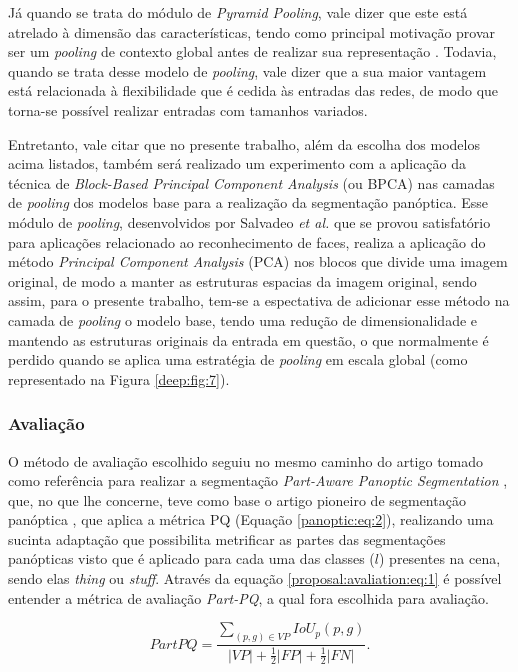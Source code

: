 Já quando se trata do módulo de \textit{Pyramid Pooling}, vale dizer que este está atrelado à dimensão das características, tendo como principal motivação provar ser um \textit{pooling} de contexto global antes de realizar sua representação \cite{Zhao2017}. Todavia, quando se trata desse modelo de \textit{pooling}, vale dizer que a sua maior vantagem está relacionada à flexibilidade que é cedida às entradas das redes, de modo que torna-se possível realizar entradas com tamanhos variados.

Entretanto, vale citar que no presente trabalho, além da escolha dos modelos acima listados, também será realizado um experimento com a aplicação da técnica de \textit{Block-Based Principal Component Analysis} (ou BPCA) nas camadas de \textit{pooling} dos modelos base para a realização da segmentação panóptica. Esse módulo de \textit{pooling}, desenvolvidos por Salvadeo \textit{et al.} \cite{Salvadeo2011} que se provou satisfatório para aplicações relacionado ao reconhecimento de faces, realiza a aplicação do método \textit{Principal Component Analysis} (PCA) nos blocos que divide uma imagem original, de modo a manter as estruturas espacias da imagem original, sendo assim, para o presente trabalho, tem-se a espectativa de adicionar esse método na camada de \textit{pooling} o modelo base, tendo uma  redução de dimensionalidade e mantendo as estruturas originais da entrada em questão, o que normalmente é perdido quando se aplica uma estratégia de \textit{pooling} em escala global (como representado na Figura \ref{deep:fig:7}).


\subsubsection{Avaliação}
\label{proposal:avaliation}
O método de avaliação escolhido seguiu no mesmo caminho do artigo tomado como referência para realizar a segmentação \textit{Part-Aware Panoptic Segmentation} \cite{DeGeus2021}, que, no que lhe concerne, teve como base o artigo pioneiro de segmentação panóptica \cite{Kirillov2019a}, que aplica a métrica PQ (Equação \ref{panoptic:eq:2}), realizando uma sucinta adaptação que possibilita metrificar as partes das segmentações panópticas visto que é aplicado para cada uma das classes ($l$) presentes na cena, sendo elas \textit{thing} ou \textit{stuff}. Através da equação \ref{proposal:avaliation:eq:1} é possível entender a métrica de avaliação \textit{Part-PQ}, a qual fora escolhida para avaliação.

\begin{equation}
\label{proposal:avaliation:eq:1}
    PartPQ = \frac{\sum _{(p,g) \in VP} IoU_p(p,g)}{|VP|+ \frac{1}{2}|FP| + \frac{1}{2}|FN|}.
\end{equation}

